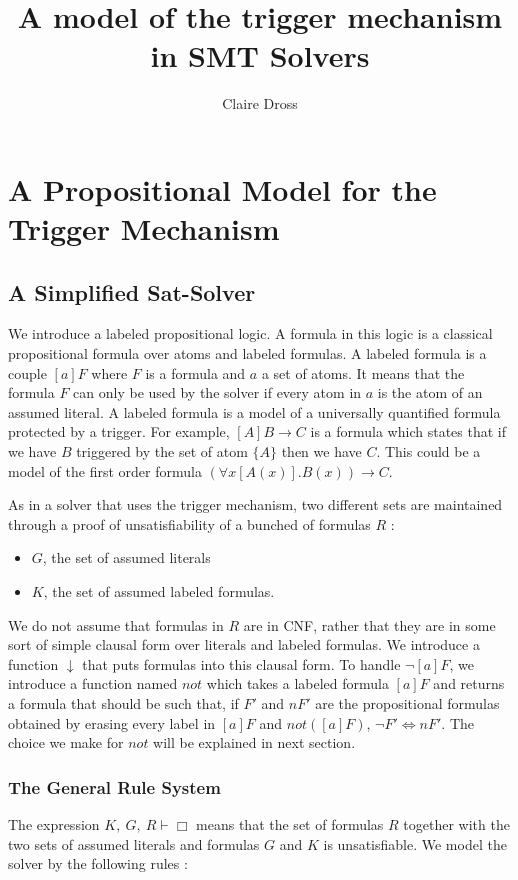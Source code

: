 \documentclass[a4paper,10pt]{report}
\title{A model of the trigger mechanism in SMT Solvers}
\author{Claire Dross}
\newcommand{\gen}{\vdash}
\newcommand{\nnot}{\mathit{not}}
\begin{document}
\maketitle
\tableofcontents

\chapter{A Propositional Model for the Trigger Mechanism}
\section{A Simplified Sat-Solver}
We introduce a labeled propositional logic. A formula in this logic is a classical propositional
formula over atoms and labeled formulas. A labeled formula is a couple $[a]F$ where $F$ is a
formula and $a$ a set of atoms. It means that the formula $F$ can only be used by the solver if
every atom in $a$ is the atom of an assumed literal. A labeled formula is a model of a universally
quantified formula protected by a trigger. For example, $[A]B\rightarrow C$ is a formula which states 
that if we have $B$ triggered by the set of atom $\{A\}$ then we have $C$. This could be a model of
the first order formula $(\forall x [A(x)]. B(x))\rightarrow C$.

As in a solver that uses the trigger mechanism, two different sets are maintained through a
proof of unsatisfiability of a bunched of formulas $R$ :
\begin{itemize}
 \item $G$, the set of assumed literals
 \item $K$, the set of assumed labeled formulas.
\end{itemize}
We do not assume that formulas in $R$ are in CNF, rather that they are in some sort of simple clausal
form over literals and labeled formulas. We introduce a function $\downarrow$ that puts formulas
into this clausal form. To handle $\neg[a]F$, we introduce a function named $\nnot$ which takes
a labeled formula $[a]F$ and returns a formula that should be such that, if $F'$ and $nF'$ are the 	propositional formulas obtained by erasing every label in $[a]F$ and $\nnot([a]F)$,
$\neg F'\Leftrightarrow nF'$. The choice we make for $\nnot$ will be explained in next section.

\subsection{The General Rule System}
The expression $K,\ G,\ R\gen\Box$ means that the set of formulas $R$ together with the two sets
of assumed literals and formulas $G$ and $K$ is unsatisfiable. We model the solver by the following
rules :
\end{document}
